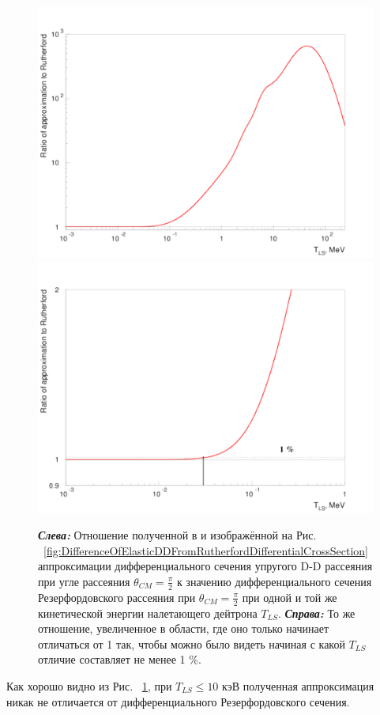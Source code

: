 \documentclass[a4paper,12pt]{article}
\begin{document}
\begin{large}
	
\begin{figure}[ht]
  {
     \includegraphics[width=0.5\linewidth]{images/ratio_of_elastic_dd_at_90_grades.pdf}
     \includegraphics[width=0.5\linewidth]{images/ratio_of_elastic_dd_at_90_grades_find_1_percent_diff.pdf}
  }
  \caption{\textit{\textbf{Слева:}} Отношение полученной в \cite{70/778-T} и изображённой на Рис. ~\ref{fig:DifferenceOfElasticDDFromRutherfordDifferentialCrossSection} аппроксимации дифференциального сечения упругого D-D рассеяния при угле рассеяния $\theta_{CM}=\frac{\pi}{2}$ к значению дифференциального сечения Резерфордовского рассеяния при $\theta_{CM}=\frac{\pi}{2}$ при одной и той же кинетической энергии налетающего дейтрона $T_{LS}$.
  \textit{\textbf{Справа:}} То же отношение, увеличенное в области, где оно только начинает отличаться от 1 так, чтобы можно было видеть начиная с какой $T_{LS}$ отличие составляет не менее 1 \%.}
  \label{fig:RatioOfElasticDDAt90Grades}
\end{figure}	
	
	
	Как хорошо видно из Рис. ~\ref{fig:RatioOfElasticDDAt90Grades}, при $T_{LS} \leq 10$ кэВ полученная аппроксимация никак не отличается от дифференциального Резерфордовского сечения.
	

\end{large}
\end{document}
